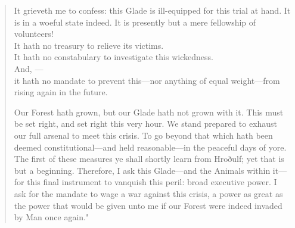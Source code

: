 \begin{quote}
		It grieveth me to confess: this Glade is ill-equipped for this trial at hand.
		It is in a woeful state indeed.
		It is presently but a mere fellowship of volunteers!\\
		It hath no treasury to relieve its victims.\\
		It hath no constabulary to investigate this wickedness.\\
		And, ---\\
		it hath no mandate to prevent this---nor anything of equal weight---from rising again in the future.

		Our Forest hath grown, but our Glade hath not grown with it.
		This must be set right, and set right this very hour.
		We stand prepared to exhaust our full arsenal to meet this crisis.
		To go beyond that which hath been deemed constitutional---and held reasonable---in the peaceful days of yore.
		The first of these measures ye shall shortly learn from Hroðulf; yet that is but a beginning.
		Therefore, I ask this Glade---and the Animals within it---for this final instrument to vanquish this peril: broad executive power. %
		I ask for the mandate to wage a war against this crisis, a power as great as the power that would be given unto me if our Forest were indeed invaded by Man once again."
	\end{quote} 
\endgroup